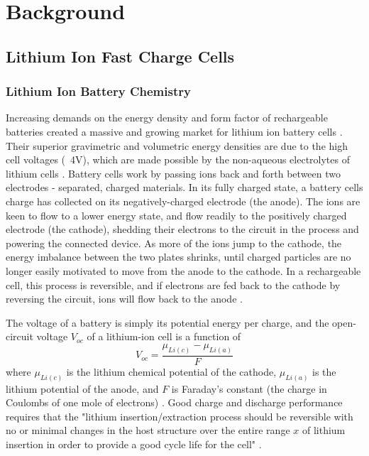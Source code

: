 \section{Background}
\subsection{Lithium Ion Fast Charge Cells}

\subsubsection{Lithium Ion Battery Chemistry}
Increasing demands on the energy density and form factor of rechargeable batteries created a massive and growing market for lithium ion battery cells \cite{LBST}. 
Their superior gravimetric and volumetric energy densities are due to the high cell voltages (~4V), which are made possible by the non-aqueous electrolytes of lithium cells \cite{LBST}. 
Battery cells work by passing ions back and forth between two electrodes - separated, charged materials. In its fully charged state, a battery cells charge has collected on its negatively-charged electrode (the anode). 
The ions are keen to flow to a lower energy state, and flow readily to the positively charged electrode (the cathode), shedding their electrons to the circuit in the process and powering the connected device. 
As more of the ions jump to the cathode, the energy imbalance between the two plates shrinks, until charged particles are no longer easily motivated to move from the anode to the cathode. 
In a rechargeable cell, this process is reversible, and if electrons are fed back to the cathode by reversing the circuit, ions will flow back to the anode \cite{LBST}. 

The voltage of a battery is simply its potential energy per charge, and the open-circuit voltage $V_{oc}$ of a lithium-ion cell is a function of
$$ V_{oc} = \frac{\mu _{Li(c)} - \mu _{Li(a)}}{F} $$
where $\mu_{Li(c)}$ is the lithium chemical potential of the cathode, $\mu_{Li(a)}$ is the lithium potential of the anode, and $F$ is Faraday's constant (the charge in Coulombs of one mole of electrons) \cite{LBST}.
Good charge and discharge performance requires that the "lithium insertion/extraction process should be reversible with no or minimal changes in the host structure over the entire range $x$ of lithium insertion in order to provide a good cycle life for the cell" \cite{LBST}.

